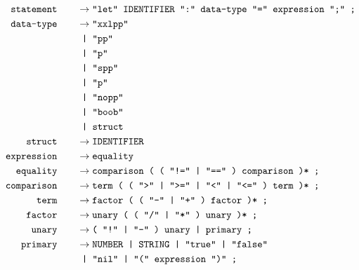 \documentclass[12pt, a4paper]{article}
\newcommand{\ttt}[1]{
    \text{\texttt{#1}}
}
\newcommand{\ebnfnode}[2]{%
    #1\hspace{20px} &\to #2\\
}
\newcommand{\ebnfnodett}[2]{%
    \ebnfnode{\ttt{#1}}{\ttt{#2}}
}
\begin{document}
    \begin{align*}
        \ebnfnodett{statement}{"let" IDENTIFIER ":" data-type "=" expression ";" ;}
        \ebnfnode{\ttt{data-type}}
        {%
            \ttt{"xxlpp"}\\
            &\ttt{ | "pp"}\\
            &\ttt{ | "p"}\\
            &\ttt{ | "spp"}\\
            &\ttt{ | "p"}\\
            &\ttt{ | "nopp"}\\
            &\ttt{ | "boob"}\\
            &\ttt{ | struct}
        }
        \ebnfnodett{struct}{IDENTIFIER}
        \ebnfnodett{expression}{equality}
        \ebnfnodett{equality}{comparison ( ( "!=" | "==" ) comparison )* ;}
        \ebnfnodett{comparison}{term ( ( ">" | ">=" | "<" | "<=" ) term )* ;}
        \ebnfnodett{term}{factor ( ( "-" | "+" ) factor )* ;}
        \ebnfnodett{factor}{unary ( ( "/" | "*" ) unary )* ;}
        \ebnfnodett{unary}{( "!" | "-" ) unary | primary ;}
        \ebnfnode{\ttt{primary}}{\ttt{NUMBER | STRING | "true" | "false"}\\&\ttt{ | "nil" | "(" expression ")" ;}}
    \end{align*}
\end{document}
